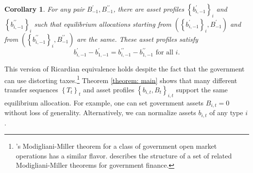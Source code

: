 \documentclass[thmsb,11pt]{article}
\newtheorem{corollary}{Corollary}
\begin{document}
\begin{corollary}
\label{corr: B does not matter} For any pair $B_{-1}^{\prime },B_{-1}^{\prime
\prime }$, there are asset profiles $\left\{ b_{i,-1}^{\prime }\right\} _{i}$ and $%
\left\{ b_{i,-1}^{\prime \prime }\right\} _{i}$ such that
equilibrium allocations starting from  $\left( \left\{ b_{i,-1}^{\prime }\right\}
_{i},B_{-1}^{\prime }\right) $ and  from  $\left( \left\{ b_{i,-1}^{\prime
\prime }\right\} _{i},B_{-1}^{\prime \prime }\right) $ are the same.
These asset profiles satisfy%
\begin{equation*}
b_{i,-1}^{\prime }-b_{1,-1}^{\prime }=b_{i,-1}^{\prime \prime
}-b_{1,-1}^{\prime \prime }\text{ for all }i.
\end{equation*}
\end{corollary}
%


%

\smallskip
 This version of Ricardian equivalence holds  despite the fact that the government can use
distorting taxes.\footnote{%
\citet{Wallace1981}'s Modigliani-Miller theorem for a class of government open
market operations has a similar flavor.  \citet{sargent1987dynamic} describes the
structure of a set of related Modigliani-Miller theorems for government
finance.} %
Theorem \ref{theorem: main} shows that many different transfer
sequences $\left\{ T_{t}\right\} _{t}$ and asset profiles $\left\{
b_{i,t},B_{t}\right\} _{i,t}$  support the same  equilibrium allocation.
For example, one can set government assets $B_{i,t}=0$ without loss of
generality.
Alternatively,  we can normalize  assets $b_{i,t}$ of any type $i$.
\end{document}
